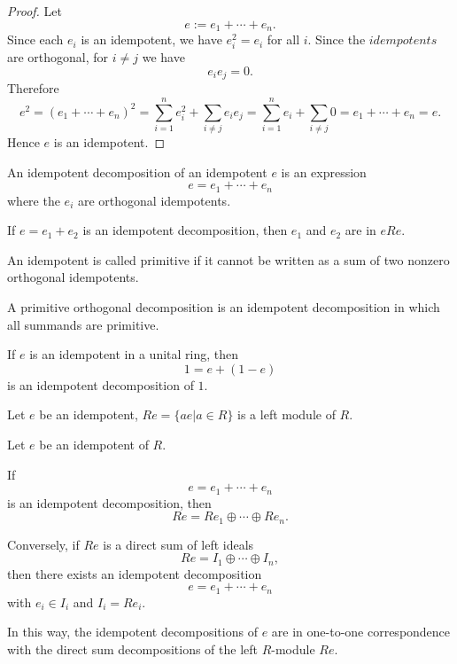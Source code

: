 \begin{proof}
    Let
    \[
        e:=e_1+\cdots+e_n.
    \]
    Since each $e_i$ is an idempotent, we have $e_i^2=e_i$ for all $i$. Since the
    $idempotents$ are orthogonal, for $i\neq j$ we have
    \[
        e_ie_j=0.
    \]
    Therefore
    \[
        e^2=(e_1+\cdots+e_n)^2
        =\sum_{i=1}^n e_i^2+\sum_{i\neq j} e_ie_j
        =\sum_{i=1}^n e_i+\sum_{i\neq j}0
        =e_1+\cdots+e_n
        =e.
    \]
    Hence $e$ is an idempotent.
\end{proof}

\begin{definition}
    An idempotent decomposition of an idempotent $e$ is an expression
    \[
        e=e_1+\cdots+e_n
    \]
    where the $e_i$ are orthogonal idempotents.
\end{definition}

\begin{remark}
    If $e=e_1+e_2$ is an idempotent decomposition, then $e_1$ and $e_2$ are in $eRe$.
\end{remark}

\begin{definition}
    An idempotent is called primitive if it cannot be written as a sum of two nonzero orthogonal idempotents.
\end{definition}

\begin{definition}
    A primitive orthogonal decomposition is an idempotent decomposition in which all summands are primitive.
\end{definition}

\begin{example}
    If $e$ is an idempotent in a unital ring, then
    \[
        1=e+(1-e)
    \]
    is an idempotent decomposition of $1$.
\end{example}

\begin{example}
    Let $e$ be an idempotent, $Re = \{ ae | a\in R\}$ is a left module of $R$.
\end{example}

\begin{theorem}
    Let $e$ be an idempotent of $R$.

    If
    \[
        e=e_1+\cdots+e_n
    \]
    is an idempotent decomposition, then
    \[
        Re=Re_1\oplus\cdots\oplus Re_n.
    \]

    Conversely, if $Re$ is a direct sum of left ideals
    \[
        Re=I_1\oplus\cdots\oplus I_n,
    \]
    then there exists an idempotent decomposition
    \[
        e=e_1+\cdots+e_n
    \]
    with $e_i\in I_i$ and $I_i=Re_i$.

    In this way, the idempotent decompositions of $e$ are in one-to-one correspondence
    with the direct sum decompositions of the left $R$-module $Re$.
\end{theorem}

